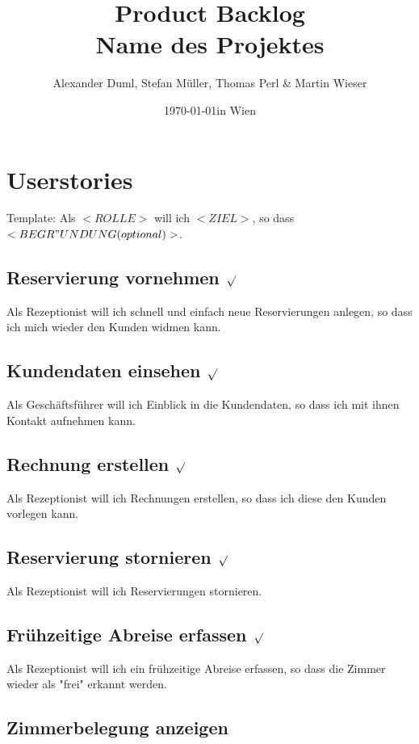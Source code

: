 \documentclass[11pt]{scrartcl}
\title{Product Backlog \\ \large Name des Projektes}
\author{Alexander Duml, Stefan Müller, Thomas Perl \& Martin Wieser}
\date{\today in Wien}
\begin{document}
\maketitle

\section{Userstories}

Template: Als $<ROLLE>$ will ich $<ZIEL>$, so dass $<BEGR"UNDUNG (optional)>$.

\subsection{Reservierung vornehmen $\surd$}

Als Rezeptionist will ich schnell und einfach neue Reservierungen anlegen, so dass ich mich wieder den Kunden widmen kann.

\subsection{Kundendaten einsehen $\surd$}

Als Geschäftsführer will ich Einblick in die Kundendaten, so dass ich mit ihnen Kontakt aufnehmen kann.

\subsection{Rechnung erstellen $\surd$}

Als Rezeptionist will ich Rechnungen erstellen, so dass ich diese den Kunden vorlegen kann.

\subsection{Reservierung stornieren $\surd$}

Als Rezeptionist will ich Reservierungen stornieren.

\subsection{Frühzeitige Abreise erfassen $\surd$}

Als Rezeptionist will ich ein frühzeitige Abreise erfassen, so dass die Zimmer wieder als "frei" erkannt werden.

\subsection{Zimmerbelegung anzeigen}
\end{document}

